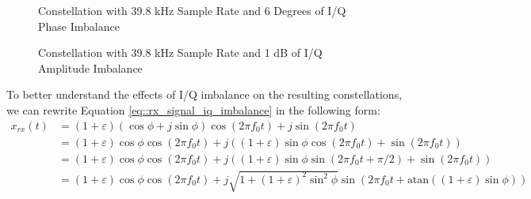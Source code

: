\documentclass{article}
\begin{document}
\begin{figure}[H]
	\centerline{}
	\caption{Constellation with 39.8 kHz Sample Rate and 6 Degrees of I/Q Phase Imbalance}
	\label{fig::iq_imbalance_0_mag_6_phase_39p8k_samp_rate_const}
\end{figure}

\begin{figure}[H]
	\centerline{}
	\caption{Constellation with 39.8 kHz Sample Rate and 1 dB of I/Q Amplitude Imbalance}
	\label{fig::iq_imbalance_1_mag_0_phase_39p8k_samp_rate_const}
\end{figure}

To better understand the effects of I/Q imbalance on the resulting constellations, we can rewrite Equation \ref{eq::rx_signal_iq_imbalance} in the following form:
\begin{align}
	x_{rx}(t) &= (1+\varepsilon)(\cos\phi + j\sin\phi)\cos(2{\pi}f_0t) + j\sin(2{\pi}f_0t) \\[6 pt]
	&= (1+\varepsilon)\cos\phi\cos(2{\pi}f_0t) + j((1+\varepsilon)\sin\phi\cos(2{\pi}f_0t) + \sin(2{\pi}f_0t)) \\[6 pt]
	&= (1+\varepsilon)\cos\phi\cos(2{\pi}f_0t) + j((1+\varepsilon)\sin\phi\sin(2{\pi}f_0t + \pi/2) + \sin(2{\pi}f_0t)) \\
	&= (1+\varepsilon)\cos\phi\cos(2{\pi}f_0t) + j\sqrt{1+(1+\varepsilon)^2\sin^2\phi}\sin(2{\pi}f_0t + \text{atan}((1+\varepsilon)\sin\phi)) \label{eq::iq_imbalance_revisited}
\end{align}
\end{document}
